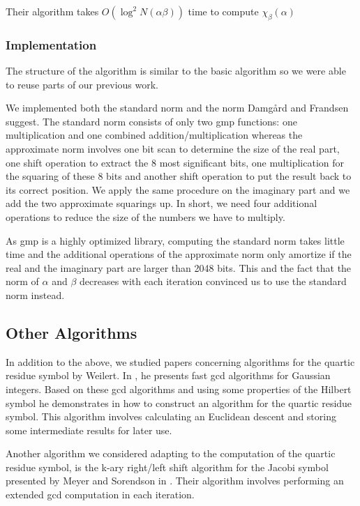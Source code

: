 \documentclass[a4paper, 11pt]{article}
\begin{document}
 Their algorithm takes $O(\log^{2}N(\alpha\beta))$ time to compute $\chi_{\beta}(\alpha)$ 
 
 \subsubsection{Implementation} 
 The structure of the algorithm is similar to the basic algorithm so we were able to reuse parts of our previous work. 
 
 We implemented both the standard norm and the norm Damg\aa rd and Frandsen suggest. The standard norm consists of only two gmp functions: one multiplication and one combined addition/multiplication whereas the approximate norm involves one bit scan to determine the size of the real part, one shift operation to extract the 8 most significant bits, one multiplication for the squaring of these 8 bits and another shift operation to put the result back to its correct position. We apply the same procedure on the imaginary part and we add the two approximate squarings up. In short, we need four additional operations to reduce the size of the numbers we have to multiply. 
 
 As gmp is a highly optimized library, computing the standard norm takes little time and the additional operations of the approximate norm only amortize if the real and the imaginary part are larger than 2048 bits. This and the fact that the norm of $\alpha$ and $\beta$ decreases with each iteration convinced us to use the standard norm instead. 
 
 \subsection{Other Algorithms} 
 In addition to the above, we studied papers concerning algorithms for the quartic residue symbol by Weilert. In \cite{weilert1},\cite{weilert2} he presents fast gcd algorithms for Gaussian integers. Based on these gcd algorithms and using some properties of the Hilbert symbol he demonstrates in \cite{weilert3} how to construct an algorithm for the quartic residue symbol. This algorithm involves calculating an Euclidean descent and storing some intermediate results for later use. 
 
 Another algorithm we considered adapting to the computation of the quartic residue symbol, is the k-ary right/left shift algorithm for the Jacobi symbol presented by Meyer and Sorendson in \cite{sorendson}. Their algorithm involves performing an extended gcd computation in each iteration. 
 
\end{document}
